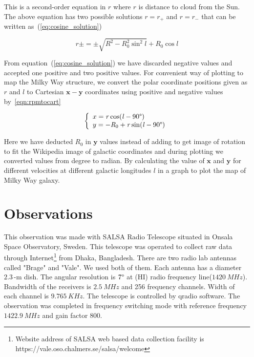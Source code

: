 \documentclass[10pt,conference]{IEEEtran}
\begin{document}
This is a second-order equation in $\mathit{r}$ where $\mathit{r}$ is distance to cloud from the Sun. The above equation has two possible solutions $\mathit{r}=\mathit{r}_{+}$ and $\mathit{r}=\mathit{r}_{-}$ that can be written as~(\ref{eq:cosine_solution})

\begin{equation}
 \mathit{r}\pm=\pm\sqrt{\mathit{R}^{2}-\mathit{R}_{0}^{2}\sin^{2} l}+\mathit{R}_{0}\cos l
 \label{eq:cosine_solution}
\end{equation}

From equation~(\ref{eq:cosine_solution}) we have discarded negative values and accepted one positive and two positive values. For convenient way of plotting to map the Milky Way structure, we convert the polar coordinate positions given as $\mathit{r}$ and $\mathit{l}$ to Cartesian $\mathbf{x-y}$ coordinates using positive and negative values by~\ref{eqn:rpmtocart}

\begin{equation}
\left\lbrace
\begin{array}{l}
	x=\mathit{r} \cos (\mathit{l}-90\degree) \\
	y=-\mathit{R}_{0}+\mathit{r} \sin (\mathit{l}-90\degree) \\
\end{array}
\right.
\label{eqn:rpmtocart}
\end{equation}

Here we have deducted $\mathit{R}_{0}$ in $\mathbf{y}$ values instead of adding to get image of rotation to fit the Wikipedia image of galactic coordinates and during plotting we converted values from degree to radian. By calculating the value of $\mathbf{x}$ and $\mathbf{y}$ for different velocities at different galactic longitudes $\mathit{l}$ in a graph to plot the map of Milky Way galaxy\cite{CathyHorellou2015,griffiths2016introduction}.

\section{Observations}

This observation was made with SALSA Radio Telescope situated in Onsala Space Observatory, Sweden. This telescope was operated to collect raw data through Internet\footnote{Website address of SALSA web based data collection facility is https://vale.oso.chalmers.se/salsa/welcome} from Dhaka, Bangladesh. There are two radio lab antennas called "Brage" and "Vale". We used both of them. Each antenna has a diameter $2.3$\,-m dish. The angular resolution is $7\degree$ at (HI) radio frequency line($\SI{1420}{MHz}$). Bandwidth of the receivers is $\SI{2.5}{MHz}$ and 256 frequency channels. Width of each channel is $\SI{9.765}{KHz}$. The telescope is controlled by qradio software. The observation was completed in frequency switching mode with reference frequency $\SI{1422.9}{MHz}$ and gain factor $800$\cite{CathyHorellou2015}.
\end{document}
